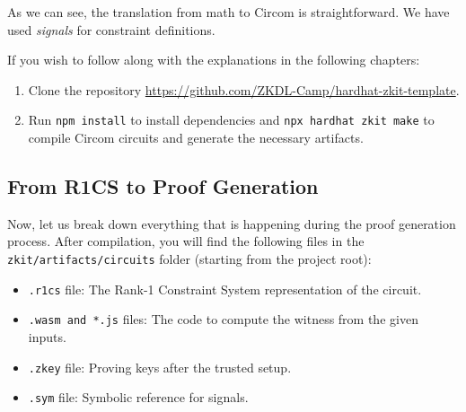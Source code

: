 \documentclass[../lecture-notes-148x210.tex]{subfiles}
\begin{document}

As we can see, the translation from math to Circom is straightforward.
We have used \textit{signals} for constraint definitions.

\begin{remark}
    If you wish to follow along with the explanations in the following chapters:
    \begin{enumerate}
        \item Clone the repository \url{https://github.com/ZKDL-Camp/hardhat-zkit-template}.
        \item Run \texttt{npm install} to install dependencies and \texttt{npx hardhat zkit make}
        to compile Circom circuits and generate the necessary artifacts.
    \end{enumerate}
\end{remark}

\subsection{From R1CS to Proof Generation}

Now, let us break down everything that is happening during the proof
generation process. After compilation, you will find the following files in
the \\
\texttt{zkit/artifacts/circuits} folder (starting from the project root):
\begin{itemize}
    \item \texttt{.r1cs} file: The Rank-1 Constraint System representation of the circuit.
    \item \texttt{.wasm and *.js} files: The code to compute the witness from the given inputs.
    \item \texttt{.zkey} file: Proving keys after the trusted setup.
    \item \texttt{.sym} file: Symbolic reference for signals.
\end{itemize}
\end{document}
